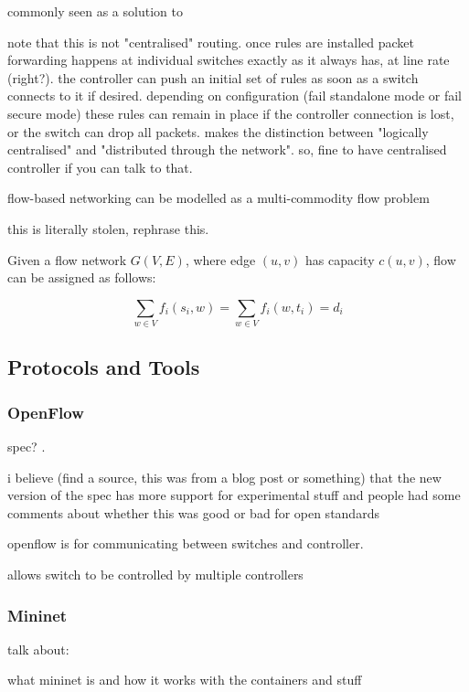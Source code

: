 \documentclass[pdftex,12pt,a4paper]{article}
\begin{document}
commonly seen as a solution to 

note that this is not "centralised" routing. once rules are installed packet forwarding happens at individual switches exactly as it always has, at line rate (right?). the controller can push an initial set of rules as soon as a switch connects to it if desired. depending on configuration (fail standalone mode or fail secure mode) these rules can remain in place if the controller connection is lost, or the switch can drop all packets. \cite{handigol:asterix} makes the distinction between "logically centralised" and "distributed through the network". so, fine to have centralised controller if you can talk to that. 

flow-based networking \cite[pp. 862--863]{cormen:algorithms} can be modelled as a multi-commodity flow problem

this is literally stolen, rephrase this.

Given a flow network $G(V,E)$, where edge $(u,v)$ has capacity $c(u,v)$, flow can be assigned as follows:

\vspace{-0.5cm}
\begin{equation}
\sum\limits_{w \in V} f_i(s_i,w) = \sum\limits_{w \in V} f_i(w,t_i) = d_i
\end{equation}

\subsection{Protocols and Tools}
\subsubsection{OpenFlow}
spec? \cite{onf:switch140}. 

i believe (find a source, this was from a blog post or something) that the new version of the spec \cite{onf:switch140} has more support for experimental stuff and people had some comments about whether this was good or bad for open standards

openflow is for communicating between switches and controller. 

allows switch to be controlled by multiple controllers \cite{mckeown:openflow}

\subsubsection{Mininet}
talk about:

what mininet is and how it works with the containers and stuff \cite{handigol:mininet}
\end{document}
